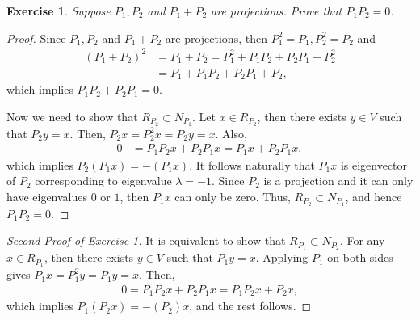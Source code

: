 \documentclass[11pt]{book}
\newtheorem{exercise}{Exercise}[section]
\theoremstyle{definition}
\numberwithin{equation}{chapter}
\begin{document}
\medskip

\begin{exercise}\label{exercise_16310}
Suppose $P_1, P_2$ and $P_1 + P_2$ are projections. Prove that $P_1 P_2 = 0$.
\end{exercise}
\begin{proof}
Since $P_1, P_2$ and $P_1 + P_2$ are projections, then $P_1^2 = P_1, P_2^2 = P_2$ and 
\begin{align*}
    \left(P_1 + P_2\right)^2 & = P_1 + P_2 = P_1^2 + P_1 P_2 + P_2 P_1 + P_2^2 \\
    & = P_1 + P_1 P_2 + P_2 P_1 + P_2,
\end{align*}
which implies $P_1 P_2 + P_2 P_1 = 0$. 

Now we need to show that $R_{P_2} \subset N_{P_1}$. Let $x \in R_{P_2}$, then there exists $y \in V$ such that $P_2 y = x$. Then, $P_2 x = P_2^2 x = P_2 y = x$. Also,
\begin{align*}
    0 & = P_1 P_2 x + P_2 P_1 x = P_1 x + P_2 P_1 x,
\end{align*}
which implies $P_2(P_1x) = - (P_1x)$. It follows naturally that $P_1 x$ is eigenvector of $P_2$ corresponding to eigenvalue $\lambda  = -1$. Since $P_2$ is a projection and it can only have eigenvalues $0$ or $1$, then $P_1 x$ can only be zero. Thus, $R_{P_2} \subset N_{P_1}$, and hence $P_1 P_2 = 0$.
\end{proof}

\medskip

\begin{proof}[Second Proof of Exercise \ref{exercise_16310}]
It is equivalent to show that $R_{P_1} \subset N_{P_2}$. For any $x \in R_{P_1}$, then there exists $y \in V$ such that $P_1y = x$. Applying $P_1$ on both sides gives $P_1x = P_1^2y = P_1y = x$. Then,
\begin{align*}
    0 = P_1P_2x + P_2P_1x = P_1P_2x + P_2x,
\end{align*}
which implies $P_1(P_2x) = - (P_2)x$, and the rest follows.
\end{proof}

\medskip
\end{document}
